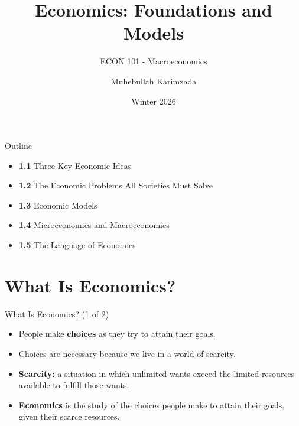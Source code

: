 \documentclass[aspectratio=169]{beamer}
\title{\textbf{Economics: Foundations and Models  \vspace{.5cm}\\  }}
\subtitle{ {\large ECON 101 - Macroeconomics}}
\author{Muhebullah Karimzada}
\date{Winter 2026}
\begin{document}
\begin{frame}[plain]
  \titlepage
\end{frame}
%
\begin{frame}{Outline}
\transfade
\begin{itemize}
  \item \textbf{1.1} Three Key Economic Ideas
  \item \textbf{1.2} The Economic Problems All Societies Must Solve
  \item \textbf{1.3} Economic Models
  \item \textbf{1.4} Microeconomics and Macroeconomics
  \item \textbf{1.5} The Language of Economics
\end{itemize}
\end{frame}

\section{What Is Economics?}

\begin{frame}{What Is Economics? (1 of 2)}
\transfade
\begin{itemize}
  \item People make \textbf{choices} as they try to attain their goals.
  \item Choices are necessary because we live in a world of \alert{scarcity}.
  \item \textbf{Scarcity:} a situation in which unlimited wants exceed the limited resources available to fulfill those wants.
  \item \textbf{Economics} is the study of the choices people make to attain their goals, given their scarce resources.
\end{itemize}
\end{frame}
\end{document}
